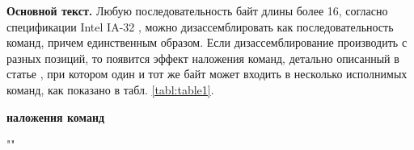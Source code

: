 \documentclass{book}
\begin{document}
\textbf{Основной текст.} Любую последовательность байт длины более 16, согласно спецификации 
Intel IA-32 \cite{Assembly}, 
можно дизассемблировать как последовательность команд, причем единственным образом. 
Если дизассемблирование производить с разных позиций, то появится эффект наложения команд, детально 
описанный в статье \cite{Rosenblum}
, при котором один и тот же байт может входить в несколько исполнимых команд, 
как показано в табл. \ref{tabl:table1}.


\begin{table}[h!]
	
	\caption {\label{tabl:table1}}
	\centering
	\textbf{ наложения команд}

	\par{""}


\end{table}
\end{document}
